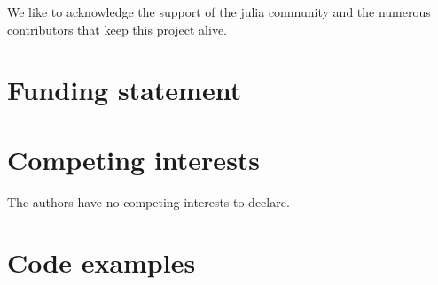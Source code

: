 We like to acknowledge the support of the julia community and the numerous contributors that keep this project alive.

\section*{Funding statement}


\section*{Competing interests}

The authors have no competing interests to declare.

\section*{Code examples}

\printbibliography



